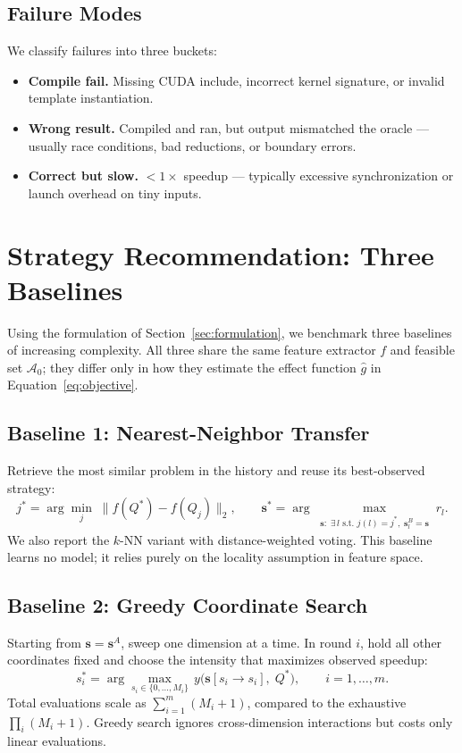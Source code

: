 \documentclass{article}
\begin{document}
\subsection{Failure Modes}

We classify failures into three buckets:
\begin{itemize}
  \item \textbf{Compile fail.} Missing CUDA include, incorrect kernel
        signature, or invalid template instantiation.
  \item \textbf{Wrong result.} Compiled and ran, but output mismatched
        the oracle --- usually race conditions, bad reductions, or
        boundary errors.
  \item \textbf{Correct but slow.} $<1\times$ speedup --- typically
        excessive synchronization or launch overhead on tiny inputs.
\end{itemize}

\section{Strategy Recommendation: Three Baselines}
\label{sec:strategy}

Using the formulation of Section~\ref{sec:formulation}, we benchmark
three baselines of increasing complexity. All three share the same
feature extractor $f$ and feasible set $\mathcal{A}_0$; they differ
only in how they estimate the effect function $\hat{g}$ in
Equation~\eqref{eq:objective}.

\subsection{Baseline 1: Nearest-Neighbor Transfer}
\label{sec:bl1}
Retrieve the most similar problem in the history and reuse its
best-observed strategy:
\begin{equation}
j^* = \arg\min_{j}\;\bigl\lVert f(Q^*) - f(Q_j)\bigr\rVert_2,
\qquad
\mathbf{s}^* = \arg\max_{\substack{\mathbf{s}:\;\exists\,l \text{ s.t. } j(l)=j^*,\; \mathbf{s}_l^B = \mathbf{s}}} r_l.
\label{eq:nn}
\end{equation}
We also report the $k$-NN variant with distance-weighted voting. This
baseline learns no model; it relies purely on the locality assumption
in feature space.

\subsection{Baseline 2: Greedy Coordinate Search}
\label{sec:bl2}
Starting from $\mathbf{s} = \mathbf{s}^A$, sweep one dimension at a
time. In round $i$, hold all other coordinates fixed and choose the
intensity that maximizes observed speedup:
\begin{equation}
s_i^* = \arg\max_{s_i \in \{0,\ldots,M_i\}}\,
  y\bigl(\mathbf{s}[s_i \!\to\! s_i],\; Q^*\bigr),
  \qquad i = 1, \ldots, m.
\label{eq:greedy}
\end{equation}
Total evaluations scale as $\sum_{i=1}^{m}(M_i + 1)$, compared to the
exhaustive $\prod_i(M_i+1)$. Greedy search ignores cross-dimension
interactions but costs only linear evaluations.
\end{document}
